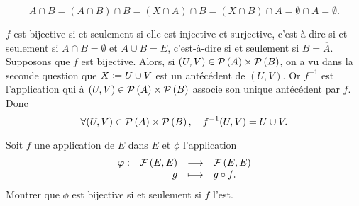 \documentclass{magnolia}
\begin{document}
\begin{sol}
\begin{questions}
\begin{itemize}
\[A\cap B=(A\cap B)\cap B=(X\cap A)\cap B=(X\cap B)\cap A=\emptyset\cap A=\emptyset.\]
\end{itemize}
\question $f$ est bijective si et seulement si elle est injective et surjective, c'est-à-dire si et seulement si $A\cap B=\emptyset$ et $A\cup B=E$, c'est-à-dire si et seulement si $B=\overline{A}$. Supposons que $f$ est bijective. Alors, si $(U,V)\in\mathcal{P}\left(A\right)\times\mathcal{P}\left(B\right)$, on a vu dans la seconde question que $X\coloneqq U\cup V$ est un antécédent de $(U,V)$. Or $f^{-1}$ est l'application qui à $(U,V)\in\mathcal{P}\left(A\right)\times\mathcal{P}\left(B\right)$ associe son unique antécédent par $f$. Donc
\[\forall (U,V)\in\mathcal{P}\left(A\right)\times\mathcal{P}\left(B\right),\quad f^{-1}(U,V)=U\cup V.\]
\end{questions}
\end{sol}

Soit $f$ une application de $E$ dans $E$ et $\phi$ l'application
\[\begin{array}[t]{lrcl} \displaystyle{\varphi} : & \displaystyle{\mathcal{F}\left(E,E\right)} & \longrightarrow & \displaystyle{\mathcal{F}\left(E,E\right)} \\ & \displaystyle{g} & \longmapsto & \displaystyle{g\circ f.} \end{array}\]
Montrer que $\phi$ est bijective si et seulement si $f$ l'est.
\end{document}
